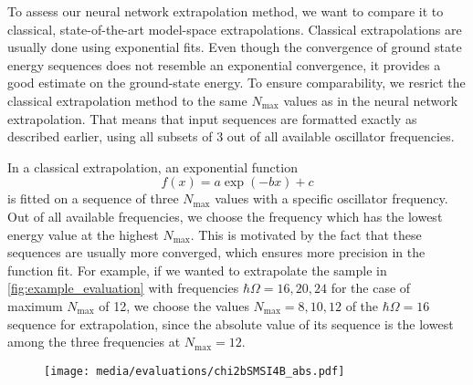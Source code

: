 To assess our neural network extrapolation method, we want to compare it to classical, state-of-the-art model-space extrapolations. Classical extrapolations are usually done using exponential fits. Even though the convergence of ground state energy sequences does not resemble an exponential convergence, it provides a good estimate on the ground-state energy. To ensure comparability, we resrict the classical extrapolation method to the same $N_\mathrm{max}$ values as in the neural network extrapolation. That means that input sequences are formatted exactly as described earlier, using all subsets of 3 out of all available oscillator frequencies.

In a classical extrapolation, an exponential function
\begin{equation}
  f(x) = a \exp(-bx) + c
\end{equation}
is fitted on a sequence of three $N_\mathrm{max}$ values with a specific oscillator frequency. Out of all available frequencies, we choose the frequency which has the lowest energy value at the highest $N_\mathrm{max}$. This is motivated by the fact that these sequences are usually more converged, which ensures more precision in the function fit. For example, if we wanted to extrapolate the sample in \autoref{fig:example_evaluation} with frequencies $\hbar\Omega = 16, 20, 24$ for the case of maximum $N_\mathrm{max}$ of 12, we choose the values  $N_\mathrm{max} = 8, 10, 12$ of the $\hbar\Omega = 16$ sequence for extrapolation, since the absolute value of its sequence is the lowest among the three frequencies at $N_\mathrm{max} = 12$.
\begin{figure}
  \texttt{[image: media/evaluations/chi2bSMSI4B\_abs.pdf]}
\end{figure}
